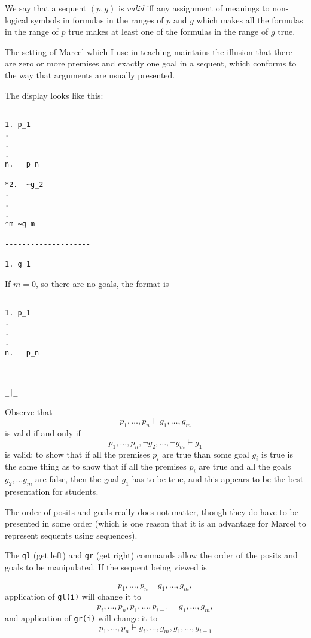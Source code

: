 \documentclass[12pt]{book}
\begin{document}
We say that a sequent $(p,g)$ is {\em valid} iff any assignment of meanings to non-logical symbols in formulas in the ranges of $p$ and $g$ which makes all the formulas in the range of $p$ true makes at least one of the formulas in the range of $g$ true.

\newpage

The setting of Marcel which I use in teaching maintains the illusion that there are zero or more premises and exactly one goal in a sequent, which conforms
to the way that arguments are usually presented.

The display looks like this:

\begin{verbatim}

1. p_1
.
.
.
n.   p_n

*2.  ~g_2
.
.
.
*m ~g_m

--------------------

1. g_1

\end{verbatim}

If $m=0$, so there are no goals, the format is

\begin{verbatim}

1. p_1
.
.
.
n.   p_n

--------------------

_|_

\end{verbatim}

Observe that $$p_1, \ldots, p_n \vdash g_1,\ldots,g_m$$  is valid if and only if $$p_1, \ldots, p_n, \neg g_2,\ldots,\neg g_m \vdash g_1$$ is valid:  to show that if all the premises $p_i$ are true than some goal $g_i$ is true is the same thing as to show that if all the premises $p_i$ are true and all the goals
$g_2, \ldots g_m$ are false, then the goal $g_1$ has to be true, and this appears to be the best presentation for students.

The order of posits and goals really does not matter, though they do have to be presented in some order (which is one reason that it is an advantage for Marcel to represent sequents using sequences).

The {\tt gl} (get left) and {\tt gr} (get right) commands allow the order of the posits and goals to be manipulated.  If the sequent being viewed is

$$p_1, \ldots, p_n \vdash g_1,\ldots,g_m,$$ application of {\tt gl(i)} will change it to $$p_i,\ldots,p_n,p_1,\ldots,p_{i-1} \vdash g_1,\ldots,g_m,$$
and application of {\tt gr(i)} will change it to $$p_1, \ldots, p_n \vdash g_i,\ldots,g_m,g_1,\ldots,g_{i-1}$$
\end{document}
